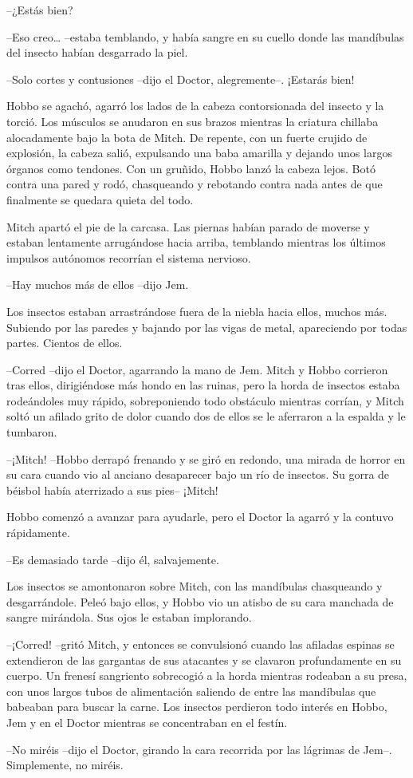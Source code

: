 {--¿Estás bien?}

{--Eso creo\ldots{} --estaba temblando, y había sangre en su cuello donde
las mandíbulas del insecto habían desgarrado la piel.}

{--Solo cortes y contusiones --dijo el Doctor, alegremente--. ¡Estarás
bien!}

{Hobbo se agachó, agarró los lados de la cabeza contorsionada del insecto
 y la torció. Los músculos se anudaron en sus brazos mientras la criatura
 chillaba alocadamente bajo la bota de Mitch. De repente, con un fuerte
 crujido de explosión, la cabeza salió, expulsando una baba amarilla y
 dejando unos largos órganos como tendones. Con un gruñido, Hobbo lanzó
 la cabeza lejos. Botó contra una pared y rodó, chasqueando y rebotando
contra nada antes de que finalmente se quedara quieta del todo.}

{Mitch apartó el pie de la carcasa. Las piernas habían parado de moverse
 y estaban lentamente arrugándose hacia arriba, temblando mientras los
últimos impulsos autónomos recorrían el sistema nervioso.}

{--Hay muchos más de ellos --dijo Jem.}

{Los insectos estaban arrastrándose fuera de la niebla hacia ellos,
 muchos más. Subiendo por las paredes y bajando por las vigas de metal,
apareciendo por todas partes. Cientos de ellos.}

{--Corred --dijo el Doctor, agarrando la mano de Jem. Mitch y Hobbo
 corrieron tras ellos, dirigiéndose más hondo en las ruinas, pero la
 horda de insectos estaba rodeándoles muy rápido, sobreponiendo todo
 obstáculo mientras corrían, y Mitch soltó un afilado grito de dolor
cuando dos de ellos se le aferraron a la espalda y le tumbaron.}

{--¡Mitch! --Hobbo derrapó frenando y se giró en redondo, una mirada de
 horror en su cara cuando vio al anciano desaparecer bajo un río de
insectos. Su gorra de béisbol había aterrizado a sus pies-- ¡Mitch!}

{Hobbo comenzó a avanzar para ayudarle, pero el Doctor la agarró y la
contuvo rápidamente.}

{--Es demasiado tarde --dijo él, salvajemente.}

{Los insectos se amontonaron sobre Mitch, con las mandíbulas chasqueando
 y desgarrándole. Peleó bajo ellos, y Hobbo vio un atisbo de su cara
manchada de sangre mirándola. Sus ojos le estaban implorando.}

{--¡Corred! --gritó Mitch, y entonces se convulsionó cuando las afiladas
 espinas se extendieron de las gargantas de sus atacantes y se clavaron
 profundamente en su cuerpo. Un frenesí sangriento sobrecogió a la horda
 mientras rodeaban a su presa, con unos largos tubos de alimentación
 saliendo de entre las mandíbulas que babeaban para buscar la carne. Los
 insectos perdieron todo interés en Hobbo, Jem y en el Doctor mientras se
concentraban en el festín.}

{--No miréis --dijo el Doctor, girando la cara recorrida por las lágrimas
de Jem--. Simplemente, no miréis.}
